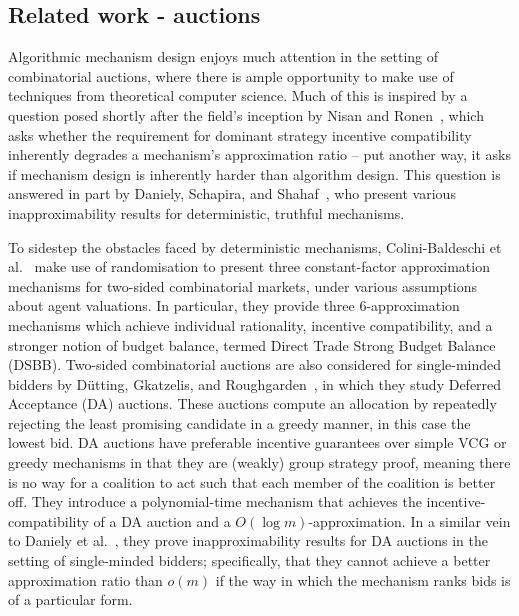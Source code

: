 \documentclass[10pt,a4paper]{article}
\theoremstyle{plain}
\theoremstyle{definition}
\begin{document}
	\subsection{Related work - auctions}

	Algorithmic mechanism design enjoys much attention in the setting of
	combinatorial auctions, where there is ample opportunity to make use of
	techniques from theoretical computer science. Much of this is inspired by a
	question posed shortly after the field's inception by Nisan and
	Ronen~\cite{Nisan2001}, which asks whether the requirement for dominant
	strategy incentive compatibility inherently degrades a mechanism's
	approximation ratio -- put another way, it asks if mechanism design is
	inherently harder than algorithm design. This question is answered in part
	by Daniely, Schapira, and Shahaf~\cite{Daniely2018}, who present various
	inapproximability results for deterministic, truthful mechanisms.

	To sidestep the obstacles faced by deterministic mechanisms,
	Colini-Baldeschi et al.~\cite{ColiniBaldeschi2017} make use of
	randomisation to present three constant-factor approximation mechanisms for
	two-sided combinatorial markets, under various assumptions about agent
	valuations. In particular, they provide three 6-approximation mechanisms
	which achieve individual rationality, incentive compatibility, and a
	stronger notion of budget balance, termed Direct Trade Strong Budget
	Balance (DSBB). Two-sided combinatorial auctions are also considered for
	single-minded bidders by D\"utting, Gkatzelis, and
	Roughgarden~\cite{Dutting2017}, in which they study Deferred Acceptance
	(DA) auctions. These auctions compute an allocation by repeatedly rejecting
	the least promising candidate in a greedy manner, in this case the lowest
	bid. DA auctions have preferable incentive guarantees over simple VCG or
	greedy mechanisms in that they are (weakly) group strategy proof, meaning
	there is no way for a coalition to act such that each member of the
	coalition is better off. They introduce a polynomial-time mechanism that
	achieves the incentive-compatibility of a DA auction and a $O(\log
	m)$-approximation. In a similar vein to Daniely et al.~\cite{Daniely2018},
	they prove inapproximability results for DA auctions in the setting of
	single-minded bidders; specifically, that they cannot achieve a better
	approximation ratio than $o(m)$ if the way in which the mechanism ranks
	bids is of a particular form.
\end{document}
